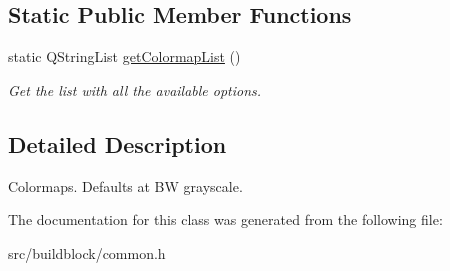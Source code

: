 \subsection*{Static Public Member Functions}
\begin{DoxyCompactItemize}
\item 
\mbox{\label{classViewer_1_1ColorMap_afa76c34f7d1b8388d25bf181743e2cc7}} 
static Q\+String\+List \mbox{\hyperlink{classViewer_1_1ColorMap_afa76c34f7d1b8388d25bf181743e2cc7}{get\+Colormap\+List}} ()
\begin{DoxyCompactList}\small\item\em Get the list with all the available options. \end{DoxyCompactList}\end{DoxyCompactItemize}


\subsection{Detailed Description}
Colormaps. Defaults at BW grayscale. 

The documentation for this class was generated from the following file\+:\begin{DoxyCompactItemize}
\item 
src/buildblock/common.\+h\end{DoxyCompactItemize}

